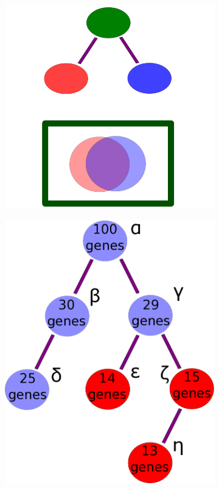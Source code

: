 \documentclass{bmcart}
\begin{document}
\begin{backmatter}
\begin{figure}[h!]
  \begin{subfigure}[b]{0.3\textwidth}
    \includegraphics[width=\textwidth]{figures/RedundancyTrimmingOntogeny.png}
   	 	\caption{}
    \label{fig:simdiagram}
  \end{subfigure}
  \begin{subfigure}[b]{0.3\textwidth}
    \includegraphics[width=\textwidth]{figures/FloorTrimmingOntogeny.png}

\end{subfigure}
\end{figure}
\end{backmatter}
\end{document}
